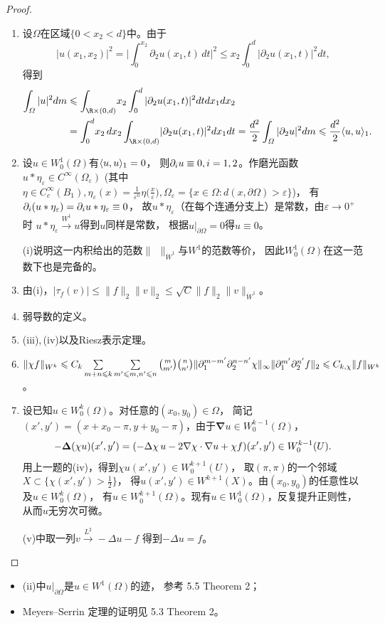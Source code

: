 \begin{proof}
\begin{enumerate}[label=(\roman*)]
\item 设$\varOmega$在区域$\{0<x_2<d\}$中。由于
\[|u(x_1,x_2)|^2=\bigg|\int_0^{x_2}\partial_2u(x_1,t)\,dt\bigg|^2
\leqslant x_2\int_0^d|\partial_2u(x_1,t)|^2dt,\]得到
\begin{align*}
    \int_\varOmega|u|^2dm
    &\leqslant \int_{\R\times(0,d)}\!x_2\int_0^d|\partial_2u(x_1,t)|^2dtdx_1dx_2\\
    &=\int_0^d\!x_2\,dx_2\int_{\R\times(0,d)}\!|\partial_2u(x_1,t)|^2dx_1dt
    =\frac{d^2}{2}\int_\varOmega|\partial_2u|^2dm
    \leqslant\frac{d^2}{2}\la u,u\ra_1.
\end{align*}
\item 设$u\in W_0^1(\varOmega)$有$\langle u,u\rangle_1=0$，
则$\mathbf{\partial}_iu\equiv0,i=1,2$。作磨光函数
$u*\eta_\varepsilon\in C^\infty(\varOmega_\varepsilon)$
(其中$\eta\in C^\infty_c(B_1),
\eta_\varepsilon(x)=\frac{1}{\varepsilon^n}\eta\big(\frac{x}{\varepsilon}\big),
\varOmega_\varepsilon=\{x\in\varOmega:d(x,\partial\varOmega)>\varepsilon\}$)，
有$\partial_i(u*\eta_\varepsilon)=\mathbf{\partial}_iu*\eta_\varepsilon\equiv0$，
故$u*\eta_\varepsilon$（在每个连通分支上）是常数，由$\varepsilon\to0^+$时
$u*\eta_\varepsilon\stackrel{W^1}{\longrightarrow}u$得到$u$同样是常数，
根据$u|_{\partial\varOmega}=0$得$u\equiv0$。

(i)说明这一内积给出的范数$\|\ \ \|_{\dot{W}^1}$与$W^1$的范数等价，
因此$W_0^1(\varOmega)$在这一范数下也是完备的。
\item 由(i)，$|\tau_f(v)|\leqslant\|f\|_2\|v\|_2\leqslant\sqrt{C}\|f\|_2\|v\|_{\dot{W}^1}$。
\item 弱导数的定义。
\item (iii),\,(iv)以及Riesz表示定理。
\item $\|\chi f\|_{W^k}\leqslant C_k\sum\limits_{m+n\leqslant k}
\sum\limits_{m'\leqslant m,n'\leqslant n}\binom{m}{m'}\binom{n}{n'}
\|\partial_1^{m-m'}\partial_2^{n-n'}\chi\|_\infty
\|\mathbf{\partial}_1^{m'}\mathbf{\partial}_2^{n'}f\|_2\leqslant C_{k,\chi}\|f\|_{W^k}$。
\item 设已知$u\in W^k_0(\varOmega)$。对任意的$(x_0,y_0)\in\varOmega$，
简记$(x',y')=(x+x_0-\pi,y+y_0-\pi)$，由于$\mathbf{\nabla}u\in W^{k-1}_0(\varOmega)$，
$$-\mathbf{\Delta}(\chi u)(x',y')=(-\Delta\chi\,u-2\nabla\chi\cdot\mathbf{\nabla}u+\chi f)(x',y')
\in W^{k-1}_0(U).$$
用上一题的(iv)，得到$\chi u(x',y')\in W^{k+1}_0(U)$，
取$(\pi,\pi)$的一个邻域$X\subset\big\{\chi(x',y')>\frac{1}{2}\big\}$，
得$u(x',y')\in W^{k+1}(X)$。由$(x_0,y_0)$的任意性以及$u\in W^k_0(\varOmega)$，
有$u\in W^{k+1}_0(\varOmega)$。现有$u\in W^1_0(\varOmega)$，反复提升正则性，从而$u$无穷次可微。

(v)中取一列$v\stackrel{L^2}{\longrightarrow}-\Delta u-f$
得到$-\Delta u=f$。\qedhere
\end{enumerate}
\end{proof}
\begin{itemize}
\item[注：] (ii)中$u|_{\partial\varOmega}$是$u\in W^1(\varOmega)$的迹，
参考\cite{Ev} 5.5 Theorem 2；
\item[] Meyers--Serrin 定理的证明见\cite{Ev} 5.3 Theorem 2。
\end{itemize}


